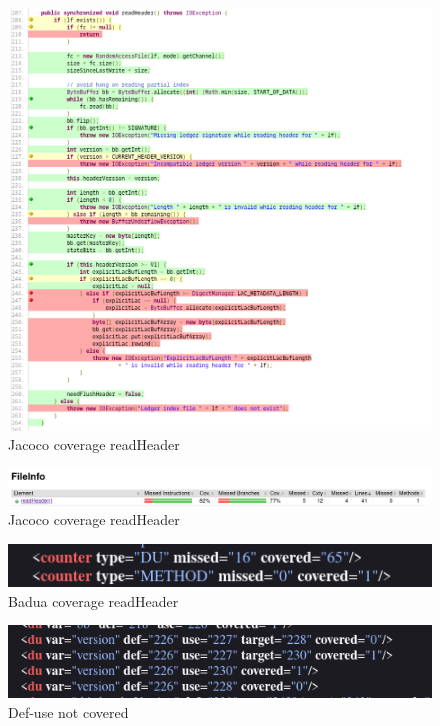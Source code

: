 \documentclass[12pt, a4paper]{article}
\begin{document}
  \begin{figure}
    \includegraphics[width=\linewidth]{./images/file_info/JacocoCoveragereadHeader2.png}
    \caption{Jacoco coverage readHeader}
    \label{fig:JacocoCoveragereadHeader2}
  \end{figure}

  \begin{figure}
    \includegraphics[width=\linewidth]{./images/file_info/JacocoCoveragereadHeader3.png}
    \caption{Jacoco coverage readHeader}
    \label{fig:JacocoCoveragereadHeader3}
  \end{figure}

  \begin{figure}
    \includegraphics[width=\linewidth]{./images/file_info/BaduaCoverageReadHeader1.png}
    \caption{Badua coverage readHeader}
    \label{fig:BaduaCoverageReadHeader1}
  \end{figure}

  \begin{figure}
    \includegraphics[width=\linewidth]{./images/file_info/BaduaCoverageReadHeader2.png}
    \caption{Def-use not covered}
    \label{fig:BaduaCoverageReadHeader2}
  \end{figure}
\end{document}
